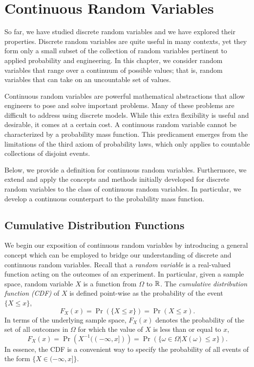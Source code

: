 \chapter{Continuous Random Variables}

So far, we have studied discrete random variables and we have explored their properties.
Discrete random variables are quite useful in many contexts, yet they form only a small subset of the collection of random variables pertinent to applied probability and engineering.
In this chapter, we consider random variables that range over a continuum of possible values; that is, random variables that can take on an uncountable set of values.

Continuous random variables are powerful mathematical abstractions that allow engineers to pose and solve important problems.
Many of these problems are difficult to address using discrete models.
While this extra flexibility is useful and desirable, it comes at a certain cost.
A continuous random variable cannot be characterized by a probability mass function.
This predicament emerges from the limitations of the third axiom of probability laws, which only applies to countable collections of disjoint events.

Below, we provide a definition for continuous random variables.
Furthermore, we extend and apply the concepts and methods initially developed for discrete random variables to the class of continuous random variables.
In particular, we develop a continuous counterpart to the probability mass function.


\section{Cumulative Distribution Functions}

We begin our exposition of continuous random variables by introducing a general concept which can be employed to bridge our understanding of discrete and continuous random variables.
Recall that a \emph{random variable} is a real-valued function acting on the outcomes of an experiment. 
In particular, given a sample space, random variable $X$ is a function from $\Omega$ to $\mathbb{R}$.
The \emph{cumulative distribution function (CDF)} of $X$ is defined point-wise as the probability of the event $\{X \leq x \}$, 
\begin{equation*}
F_X (x) = \Pr ( \{ X \leq x \} ) = \Pr (X \leq x).
\end{equation*}
In terms of the underlying sample space, $F_X (x)$ denotes the probability of the set of all outcomes in $\Omega$ for which the value of $X$ is less than or equal to $x$,
\begin{equation*}
F_X (x) = \Pr \left( X^{-1} ( (- \infty, x]) \right)
= \Pr (\{ \omega \in \Omega | X(\omega) \leq x \}).
\end{equation*}
In essence, the CDF is a convenient way to specify the probability of all events of the form $\{ X \in (-\infty, x] \}$.

